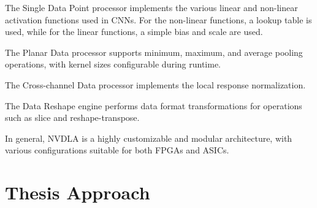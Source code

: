 The Single Data Point processor implements the various linear and non-linear activation functions used in CNNs. For the non-linear functions, a lookup table is used, while for the linear functions, a simple bias and scale are used.

The Planar Data processor supports minimum, maximum, and average pooling operations, with kernel sizes configurable during runtime.

The Cross-channel Data processor implements the local response normalization.

The Data Reshape engine performs data format transformations for operations such as slice and reshape-transpose.

In general, NVDLA is a highly customizable and modular architecture, with various configurations suitable for both FPGAs and ASICs.

\section{Thesis Approach}

